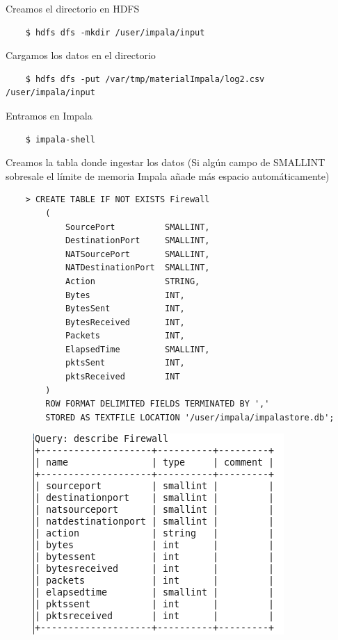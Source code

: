 \documentclass[13pt,a4paper]{article}
\begin{document}
\vspace{\baselineskip}

Creamos el directorio en HDFS
\begin{lstlisting}
    $ hdfs dfs -mkdir /user/impala/input
\end{lstlisting}

\vspace{\baselineskip}

Cargamos los datos en el directorio
\begin{lstlisting}
    $ hdfs dfs -put /var/tmp/materialImpala/log2.csv /user/impala/input
\end{lstlisting}

\vspace{\baselineskip}

Entramos en Impala
\begin{lstlisting}
    $ impala-shell
\end{lstlisting}

\vspace{\baselineskip}

Creamos la tabla donde ingestar los datos (Si algún campo de SMALLINT sobresale el límite de memoria Impala añade más espacio automáticamente)
\begin{lstlisting}
    > CREATE TABLE IF NOT EXISTS Firewall
        (
            SourcePort          SMALLINT,
            DestinationPort     SMALLINT,
            NATSourcePort       SMALLINT,
            NATDestinationPort  SMALLINT,
            Action              STRING,
            Bytes               INT,
            BytesSent           INT,
            BytesReceived       INT,
            Packets             INT,
            ElapsedTime         SMALLINT,
            pktsSent            INT,
            pktsReceived        INT
        )
        ROW FORMAT DELIMITED FIELDS TERMINATED BY ','
        STORED AS TEXTFILE LOCATION '/user/impala/impalastore.db';
\end{lstlisting}

\begin{figure}[H]\center\includegraphics[width=.75\linewidth]{img/1.png}\end{figure}
\end{document}
